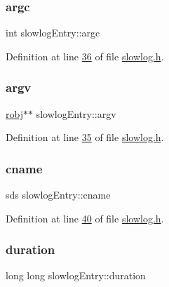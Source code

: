 \subsubsection{\texorpdfstring{argc}{argc}}
{\footnotesize\ttfamily int slowlog\+Entry\+::argc}



Definition at line \hyperlink{slowlog_8h_source_l00036}{36} of file \hyperlink{slowlog_8h_source}{slowlog.\+h}.

\mbox{\label{structslowlogEntry_a731739c02a0cff6336c7cab1b3b388ae}} 
\subsubsection{\texorpdfstring{argv}{argv}}
{\footnotesize\ttfamily \hyperlink{structredisObject}{robj}$\ast$$\ast$ slowlog\+Entry\+::argv}



Definition at line \hyperlink{slowlog_8h_source_l00035}{35} of file \hyperlink{slowlog_8h_source}{slowlog.\+h}.

\mbox{\label{structslowlogEntry_ae97061f57a9fe9618808f49181c98ed5}} 
\subsubsection{\texorpdfstring{cname}{cname}}
{\footnotesize\ttfamily sds slowlog\+Entry\+::cname}



Definition at line \hyperlink{slowlog_8h_source_l00040}{40} of file \hyperlink{slowlog_8h_source}{slowlog.\+h}.

\mbox{\label{structslowlogEntry_a16b338bdd4baff83c93c0cb324254ce2}} 
\subsubsection{\texorpdfstring{duration}{duration}}
{\footnotesize\ttfamily long long slowlog\+Entry\+::duration}



